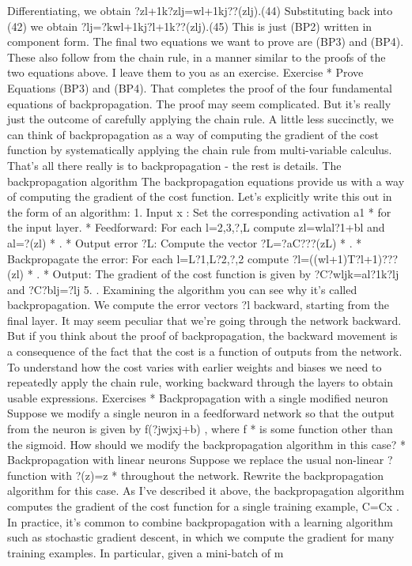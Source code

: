 Differentiating, we obtain 
?zl+1k?zlj=wl+1kj??(zlj).(44)
Substituting back into (42) we obtain 
?lj=?kwl+1kj?l+1k??(zlj).(45)
This is just (BP2) written in component form.
The final two equations we want to prove are (BP3) and (BP4). These also follow from the chain rule, in a manner similar to the proofs of the two equations above. I leave them to you as an exercise. 
Exercise
* Prove Equations (BP3) and (BP4). 
That completes the proof of the four fundamental equations of backpropagation. The proof may seem complicated. But it's really just the outcome of carefully applying the chain rule. A little less succinctly, we can think of backpropagation as a way of computing the gradient of the cost function by systematically applying the chain rule from multi-variable calculus. That's all there really is to backpropagation - the rest is details.
The backpropagation algorithm
The backpropagation equations provide us with a way of computing the gradient of the cost function. Let's explicitly write this out in the form of an algorithm: 
1. Input x
: Set the corresponding activation a1
*  for the input layer. 
*  Feedforward: For each l=2,3,?,L compute zl=wlal?1+bl and al=?(zl)
*  .
*  Output error ?L: Compute the vector ?L=?aC???(zL)
*  .
*  Backpropagate the error: For each l=L?1,L?2,?,2 compute ?l=((wl+1)T?l+1)???(zl)
*  .
*  Output: The gradient of the cost function is given by ?C?wljk=al?1k?lj and ?C?blj=?lj
5. . 
Examining the algorithm you can see why it's called backpropagation. We compute the error vectors ?l
backward, starting from the final layer. It may seem peculiar that we're going through the network backward. But if you think about the proof of backpropagation, the backward movement is a consequence of the fact that the cost is a function of outputs from the network. To understand how the cost varies with earlier weights and biases we need to repeatedly apply the chain rule, working backward through the layers to obtain usable expressions.
Exercises
* Backpropagation with a single modified neuron Suppose we modify a single neuron in a feedforward network so that the output from the neuron is given by f(?jwjxj+b)
, where f
*  is some function other than the sigmoid. How should we modify the backpropagation algorithm in this case?
*  Backpropagation with linear neurons Suppose we replace the usual non-linear ? function with ?(z)=z
* throughout the network. Rewrite the backpropagation algorithm for this case. 
As I've described it above, the backpropagation algorithm computes the gradient of the cost function for a single training example, C=Cx
. In practice, it's common to combine backpropagation with a learning algorithm such as stochastic gradient descent, in which we compute the gradient for many training examples. In particular, given a mini-batch of m
